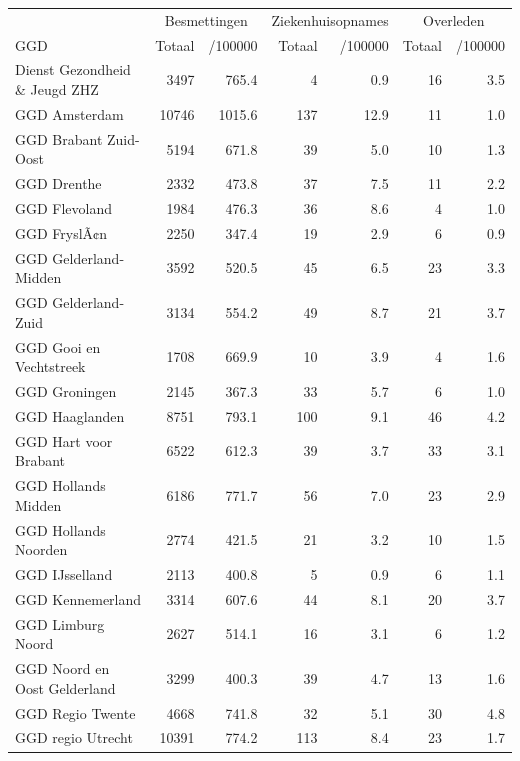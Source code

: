 \documentclass[
  english,
  man,floatsintext]{apa6}
\begin{document}
\begin{table}[H]
\centering\begingroup\fontsize{10}{12}\selectfont

\begin{threeparttable}
\begin{tabular}{lrrrrrr}
\toprule
\multicolumn{1}{c}{ } & \multicolumn{2}{c}{Besmettingen} & \multicolumn{2}{c}{Ziekenhuisopnames} & \multicolumn{2}{c}{Overleden} \\
\cmidrule(l{3pt}r{3pt}){2-3} \cmidrule(l{3pt}r{3pt}){4-5} \cmidrule(l{3pt}r{3pt}){6-7}
GGD & Totaal & /100000 & Totaal & /100000 & Totaal & /100000\\
\midrule
Dienst Gezondheid \& Jeugd ZHZ & 3497 & 765.4 & 4 & 0.9 & 16 & 3.5\\
GGD Amsterdam & 10746 & 1015.6 & 137 & 12.9 & 11 & 1.0\\
GGD Brabant Zuid-Oost & 5194 & 671.8 & 39 & 5.0 & 10 & 1.3\\
GGD Drenthe & 2332 & 473.8 & 37 & 7.5 & 11 & 2.2\\
GGD Flevoland & 1984 & 476.3 & 36 & 8.6 & 4 & 1.0\\
GGD FryslÃ¢n & 2250 & 347.4 & 19 & 2.9 & 6 & 0.9\\
GGD Gelderland-Midden & 3592 & 520.5 & 45 & 6.5 & 23 & 3.3\\
GGD Gelderland-Zuid & 3134 & 554.2 & 49 & 8.7 & 21 & 3.7\\
GGD Gooi en Vechtstreek & 1708 & 669.9 & 10 & 3.9 & 4 & 1.6\\
GGD Groningen & 2145 & 367.3 & 33 & 5.7 & 6 & 1.0\\
GGD Haaglanden & 8751 & 793.1 & 100 & 9.1 & 46 & 4.2\\
GGD Hart voor Brabant & 6522 & 612.3 & 39 & 3.7 & 33 & 3.1\\
GGD Hollands Midden & 6186 & 771.7 & 56 & 7.0 & 23 & 2.9\\
GGD Hollands Noorden & 2774 & 421.5 & 21 & 3.2 & 10 & 1.5\\
GGD IJsselland & 2113 & 400.8 & 5 & 0.9 & 6 & 1.1\\
GGD Kennemerland & 3314 & 607.6 & 44 & 8.1 & 20 & 3.7\\
GGD Limburg Noord & 2627 & 514.1 & 16 & 3.1 & 6 & 1.2\\
GGD Noord en Oost Gelderland & 3299 & 400.3 & 39 & 4.7 & 13 & 1.6\\
GGD Regio Twente & 4668 & 741.8 & 32 & 5.1 & 30 & 4.8\\
GGD regio Utrecht & 10391 & 774.2 & 113 & 8.4 & 23 & 1.7\\

\end{tabular}
\end{threeparttable}
\end{table}
\end{document}
